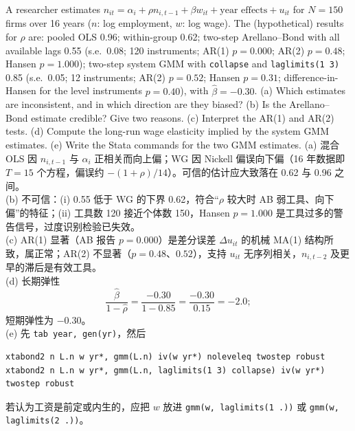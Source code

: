 \begin{prac}\label{pr:U12c-c4}
A researcher estimates $n_{it}=\alpha_i+\rho n_{i,t-1}+\beta w_{it}+\text{year effects}+u_{it}$ for $N=150$ firms over 16 years ($n$: log employment, $w$: log wage). The (hypothetical) results for $\rho$ are: pooled OLS 0.96; within-group 0.62; two-step Arellano--Bond with all available lags 0.55 (s.e.\ 0.08; 120 instruments; AR(1) $p=0.000$; AR(2) $p=0.48$; Hansen $p=1.000$); two-step system GMM with \texttt{collapse} and \texttt{laglimits(1 3)} 0.85 (s.e.\ 0.05; 12 instruments; AR(2) $p=0.52$; Hansen $p=0.31$; difference-in-Hansen for the level instruments $p=0.40$), with $\hat\beta=-0.30$. (a) Which estimates are inconsistent, and in which direction are they biased? (b) Is the Arellano--Bond estimate credible? Give two reasons. (c) Interpret the AR(1) and AR(2) tests. (d) Compute the long-run wage elasticity implied by the system GMM estimates. (e) Write the Stata commands for the two GMM estimates.
\answer
(a) 混合 OLS 因 $n_{i,t-1}$ 与 $\alpha_i$ 正相关而向上偏；WG 因 Nickell 偏误向下偏（16 年数据即 $T=15$ 个方程，偏误约 $-(1+\rho)/14$）。可信的估计应大致落在 0.62 与 0.96 之间。\\
(b) 不可信：(i) 0.55 低于 WG 的下界 0.62，符合“$\rho$ 较大时 AB 弱工具、向下偏”的特征；(ii) 工具数 120 接近个体数 150，Hansen $p=1.000$ 是工具过多的警告信号，过度识别检验已失效。\\
(c) AR(1) 显著（AB 报告 $p=0.000$）是差分误差 $\Delta u_{it}$ 的机械 MA(1) 结构所致，属正常；AR(2) 不显著（$p=0.48$、$0.52$），支持 $u_{it}$ 无序列相关，$n_{i,t-2}$ 及更早的滞后是有效工具。\\
(d) 长期弹性
\[
\frac{\hat\beta}{1-\hat\rho}=\frac{-0.30}{1-0.85}=\frac{-0.30}{0.15}=-2.0;
\]
短期弹性为 $-0.30$。\\
(e) 先 \texttt{tab year, gen(yr)}，然后
\begin{lstlisting}
xtabond2 n L.n w yr*, gmm(L.n) iv(w yr*) noleveleq twostep robust
xtabond2 n L.n w yr*, gmm(L.n, laglimits(1 3) collapse) iv(w yr*) twostep robust
\end{lstlisting}
若认为工资是前定或内生的，应把 $w$ 放进 \texttt{gmm(w, laglimits(1 .))} 或 \texttt{gmm(w, laglimits(2 .))}。
\end{prac}

